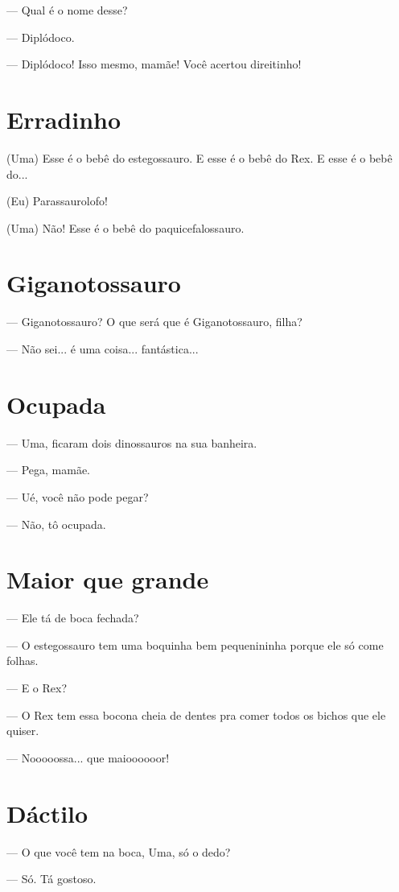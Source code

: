 {— Qual é o nome desse?

— Diplódoco.

— Diplódoco! Isso mesmo, mamãe! Você acertou direitinho!

\chapter{Erradinho}

(Uma) Esse é o bebê do estegossauro. E esse é o bebê do Rex. E esse é o
bebê do...

(Eu) Parassaurolofo!

(Uma) Não! Esse é o bebê do paquicefalossauro.

\chapter{Giganotossauro}

— Giganotossauro? O que será que é Giganotossauro, filha?

— Não sei... é uma coisa... fantástica...

\chapter{Ocupada}

— Uma, ficaram dois dinossauros na sua banheira.

— Pega, mamãe.

— Ué, você não pode pegar?

— Não, tô ocupada.

\chapter{Maior que grande}

— Ele tá de boca fechada?

— O estegossauro tem uma boquinha bem pequenininha porque ele só come
folhas.

— E o Rex?

— O Rex tem essa bocona cheia de dentes pra comer todos os bichos que
ele quiser.

— Nooooossa... que maioooooor!

\chapter{Dáctilo}

— O que você tem na boca, Uma, só o dedo?

— Só. Tá gostoso.

}
